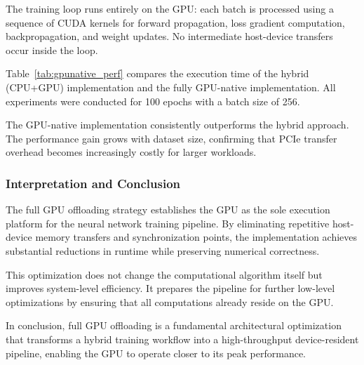 \documentclass[conference, 12pt]{IEEEtran}
\begin{document}
The training loop runs entirely on the GPU: each batch is processed using a sequence of CUDA kernels for forward propagation, loss gradient computation, backpropagation, and weight updates. No intermediate host-device transfers occur inside the loop.

Table~\ref{tab:gpunative_perf} compares the execution time of the hybrid (CPU+GPU) implementation and the fully GPU-native implementation. All experiments were conducted for 100 epochs with a batch size of 256.

\begin{table}[h!]
\centering
\caption{Execution time comparison: Hybrid vs GPU-Native implementation}
\label{tab:gpunative_perf}
\end{table}

The GPU-native implementation consistently outperforms the hybrid approach. The performance gain grows with dataset size, confirming that PCIe transfer overhead becomes increasingly costly for larger workloads.

\subsubsection{Interpretation and Conclusion}
The full GPU offloading strategy establishes the GPU as the sole execution platform for the neural network training pipeline. By eliminating repetitive host-device memory transfers and synchronization points, the implementation achieves substantial reductions in runtime while preserving numerical correctness.

This optimization does not change the computational algorithm itself but improves system-level efficiency. It prepares the pipeline for further low-level optimizations by ensuring that all computations already reside on the GPU.

In conclusion, full GPU offloading is a fundamental architectural optimization that transforms a hybrid training workflow into a high-throughput device-resident pipeline, enabling the GPU to operate closer to its peak performance.
\end{document}
